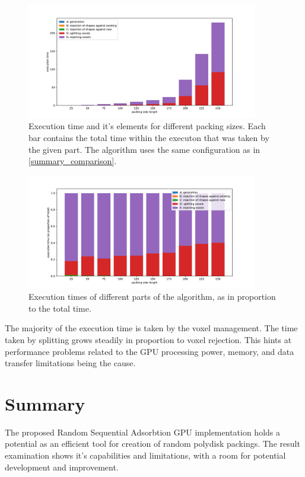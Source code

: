 \documentclass[12pt, oneside]{report}
\begin{document}
\begin{figure}[H]
  \centering
	\label{summary_times_total}
	\includegraphics[width=0.9\textwidth,keepaspectratio]{Images/SummaryComparison/parts_total.pdf}
	\caption{Execution time and it's elements for different packing sizes. Each bar contains the total time within the executon that was taken by the given part. The algorithm uses the same configuration as in \ref{summary_comparison}. }
\end{figure}

\begin{figure}[H]
  \centering
	\label{summary_times_proportional}
	\includegraphics[width=0.9\textwidth,keepaspectratio]{Images/SummaryComparison/parts_proportional.pdf}
	\caption{Execution times of different parts of the algorithm, as in proportion to the total time.}
\end{figure}

The majority of the execution time is taken by the voxel management. The time taken by splitting grows steadily in proportion to voxel rejection. This hints at performance problems related to the GPU processing power, memory, and data transfer limitations being the cause.


\section{Summary}

The proposed Random Sequential Adsorbtion GPU implementation holds a potential as an efficient tool for creation of random polydisk packings. The result examination shows it's capabilities and limitations, with a room for potential development and improvement.


\newpage
\printbibliography
\end{document}
